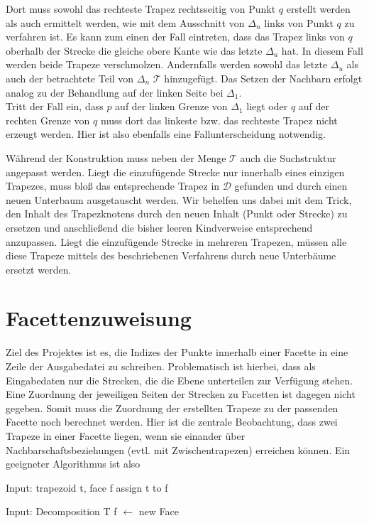 \documentclass[11pt, a4paper]{article}
\newcommand{\T}{\ensuremath{\mathcal{T}} }
\newcommand{\D}{\ensuremath{\mathcal{D}} }
\begin{document}
Dort muss sowohl das rechteste Trapez rechtsseitig von Punkt $q$ erstellt werden als auch ermittelt werden, wie mit dem Ausschnitt von $\Delta_n$ links von Punkt $q$ zu verfahren ist. Es kann zum einen der Fall eintreten, dass das Trapez links von $q$ oberhalb der Strecke die gleiche obere Kante wie das letzte $\Delta_u$ hat. In diesem Fall werden beide Trapeze verschmolzen. Andernfalls werden sowohl das letzte $\Delta_u$ als auch der betrachtete Teil von $\Delta_n$ \T hinzugefügt. Das Setzen der Nachbarn erfolgt analog zu der Behandlung auf der linken Seite bei $\Delta_1$.\\
Tritt der Fall ein, dass $p$ auf der linken Grenze von $\Delta_1$ liegt oder $q$ auf der rechten Grenze von $q$ muss dort das linkeste bzw. das rechteste Trapez nicht erzeugt werden. Hier ist also ebenfalls eine Fallunterscheidung notwendig.

Während der Konstruktion muss neben der Menge \T auch die Suchstruktur angepasst werden. Liegt die einzufügende Strecke nur innerhalb eines einzigen Trapezes, muss bloß das entsprechende Trapez in \D gefunden und durch einen neuen Unterbaum ausgetauscht werden. Wir behelfen uns dabei mit dem Trick, den Inhalt des Trapezknotens durch den neuen Inhalt (Punkt oder Strecke) zu ersetzen und anschließend die bisher leeren Kindverweise entsprechend anzupassen. Liegt die einzufügende Strecke in mehreren Trapezen, müssen alle diese Trapeze mittels des beschriebenen Verfahrens durch neue Unterbäume ersetzt werden.

\section{Facettenzuweisung}
Ziel des Projektes ist es, die Indizes der Punkte innerhalb einer Facette in eine Zeile der Ausgabedatei zu schreiben. Problematisch ist hierbei, dass als Eingabedaten nur die Strecken, die die Ebene unterteilen zur Verfügung stehen. Eine Zuordnung der jeweiligen Seiten der Strecken zu Facetten ist dagegen nicht gegeben. Somit muss die Zuordnung der erstellten Trapeze zu der passenden Facette noch berechnet werden. Hier ist die zentrale Beobachtung, dass zwei Trapeze in einer Facette liegen, wenn sie einander über Nachbarschaftsbeziehungen (evtl. mit Zwischentrapezen) erreichen können. Ein geeigneter Algorithmus ist also

\begin{algorithmic}[1]
\State Input: trapezoid t, face f
		\State assign t to f
			\State {}
		\EndFor
	\EndIf
\EndFunction

\State Input: Decomposition T
		\State f $\gets$ new Face
		\State {}
	\EndFor
\EndFunction
\end{algorithmic}
\end{document}
